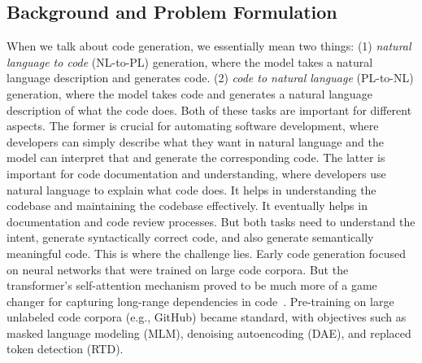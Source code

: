 \documentclass[12pt]{article}
\begin{document}
\subsection{Background and Problem Formulation}
When we talk about code generation, we essentially mean two things: (1) \textit{natural language to code} (NL-to-PL) generation, where the model takes a natural language description and generates code. (2) \textit{code to natural language} (PL-to-NL) generation, where the model takes code and generates a natural language description of what the code does. Both of these tasks are important for different aspects. The former is crucial for automating software development, where developers can simply describe what they want in natural language and the model can interpret that and generate the corresponding code. The latter is important for code documentation and understanding, where developers use natural language to explain what code does. It helps in understanding the codebase and maintaining the codebase effectively. It eventually helps in documentation and code review processes. But both tasks need to understand the intent, generate syntactically correct code, and also generate semantically meaningful code. This is where the challenge lies.
Early code generation focused on neural networks that were trained on large code corpora. But the transformer's self-attention mechanism proved to be much more of a game changer for capturing long-range dependencies in code~\cite{vaswani2023attentionneed}. Pre-training on large unlabeled code corpora (e.g., GitHub) became standard, with objectives such as masked language modeling (MLM), denoising autoencoding (DAE), and replaced token detection (RTD).
\end{document}
